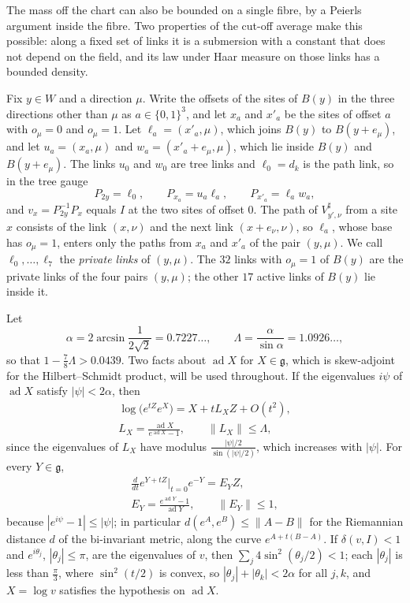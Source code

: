 \documentclass[11pt]{amsart}
\theoremstyle{definition}
\theoremstyle{remark}
\numberwithin{equation}{section}
\newcommand{\g}{\mathfrak{g}}
\begin{document}
The mass off the chart can also be bounded on a single fibre, by a Peierls
argument inside the fibre. Two properties of the cut-off average make this
possible: along a fixed set of links it is a submersion with a constant that
does not depend on the field, and its law under Haar measure on those links
has a bounded density.

Fix $y\in W$ and a direction $\mu$. Write the offsets of the sites of $B(y)$
in the three directions other than $\mu$ as $a\in\{0,1\}^3$, and let $x_a$
and $x'_a$ be the sites of offset $a$ with $o_\mu=0$ and $o_\mu=1$. Let
$\ell_a=(x'_a,\mu)$, which joins $B(y)$ to $B(y+e_\mu)$, and let $u_a=(x_a,
\mu)$ and $w_a=(x'_a+e_\mu,\mu)$, which lie inside $B(y)$ and $B(y+e_\mu)$.
The links $u_0$ and $w_0$ are tree links and $\ell_0=d_k$ is the path link,
so in the tree gauge
\[
P_{2y}=\ell_0,\qquad P_{x_a}=u_a\ell_a,\qquad P_{x'_a}=\ell_aw_a,
\]
and $v_x=P_{2y}^{-1}P_x$ equals $I$ at the two sites of offset $0$. The path
of $V^\sharp_{y',\nu}$ from a site $x$ consists of the link $(x,\nu)$ and
the next link $(x+e_\nu,\nu)$, so $\ell_a$, whose base has $o_\mu=1$, enters
only the paths from $x_a$ and $x'_a$ of the pair $(y,\mu)$. We call $\ell_0,
\dots,\ell_7$ the \emph{private links} of $(y,\mu)$. The $32$ links with
$o_\mu=1$ of $B(y)$ are the private links of the four pairs $(y,\mu)$; the
other $17$ active links of $B(y)$ lie inside it.

Let
\[
\alpha=2\arcsin\frac1{2\sqrt2}=0.7227\ldots,\qquad\Lambda=\frac\alpha
{\sin\alpha}=1.0926\ldots,
\]
so that $1-\frac78\Lambda>0.0439$. Two
facts about $\operatorname{ad}X$ for $X\in\g$, which is skew-adjoint for
the Hilbert--Schmidt product, will be used throughout. If the eigenvalues
$i\psi$ of $\operatorname{ad}X$ satisfy $|\psi|<2\alpha$, then
\begin{gather*}
\log\bigl(e^{tZ}e^X\bigr)=X+tL_XZ+O(t^2),\\
L_X=\frac{\operatorname{ad}X}{e^{\operatorname{ad}X}-1},\qquad\lVert L_X
\rVert\le\Lambda,
\end{gather*}
since the eigenvalues of $L_X$ have modulus $\frac{|\psi|/2}{\sin(|\psi|/2
)}$, which increases with $|\psi|$. For every $Y\in\g$,
\begin{gather*}
\frac d{dt}e^{Y+tZ}\Big|_{t=0}e^{-Y}=E_YZ,\\
E_Y=\frac{e^{\operatorname{ad}Y}-1}{\operatorname{ad}Y},\qquad\lVert E_Y
\rVert\le1,
\end{gather*}
because $|e^{i\psi}-1|\le|\psi|$; in particular $d(e^A,e^B)\le\lVert A-B
\rVert$ for the Riemannian distance $d$ of the bi-invariant metric, along
the curve $e^{A+t(B-A)}$. If $\delta(v,I)<1$ and $e^{i\theta_j}$, $|\theta
_j|\le\pi$, are the eigenvalues of $v$, then $\sum_j4\sin^2(\theta_j/2)<1$;
each $|\theta_j|$ is less than $\frac\pi3$, where $\sin^2(t/2)$ is convex,
so $|\theta_j|+|\theta_k|<2\alpha$ for all $j,k$, and $X=\log v$ satisfies
the hypothesis on $\operatorname{ad}X$.
\end{document}
